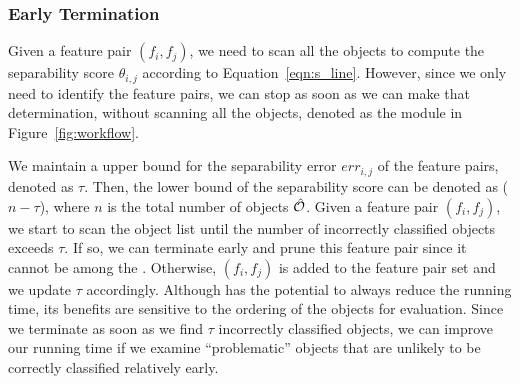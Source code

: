 
\subsubsection{Early Termination} \label{ssec:earlyT}

Given a feature pair $(f_i,f_j)$, 
we need to scan all the objects 
to compute the separability score $\theta_{i,j}$ according to Equation~\ref{eqn:s_line}. 
However, since we only need to identify the \topk feature pairs,
we can stop as soon as we can make that determination, without
scanning all the objects, denoted as the \earlyT module in Figure~\ref{fig:workflow}.

 We maintain a upper bound 
for the separability error $err_{i,j}$ of the \topk feature pairs, 
denoted as $\tau$. 
Then, the lower bound of the separability 
score can be denoted as ($n-\tau$), 
where $n$ is the total number of objects $\hat{{\mathcal{O}}}$. 
Given a feature pair $(f_i,f_j)$, we start to scan the object list until the number of incorrectly classified objects exceeds $\tau$. If so, we can terminate early and prune this feature pair since it cannot be among the \topk. 
Otherwise, $(f_i,f_j)$ is added to the \topk feature pair set and we update $\tau$ accordingly. Although \earlyT has the potential to always reduce the running time, its benefits are sensitive to the ordering of the objects for evaluation. Since we terminate as soon as we find $\tau$ incorrectly classified objects, we can improve our running time if we examine ``problematic'' objects that are unlikely to be correctly classified relatively early.

